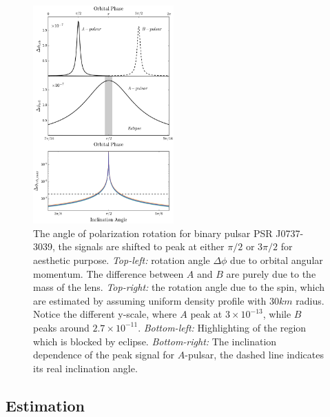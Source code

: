 \documentclass[aps,showpacs,twocolumn,floats,prd,superscriptaddress,nofootinbib]{revtex4}
\begin{document}
\begin{figure}
\includegraphics[width=0.48\textwidth]{rotang.eps}
\caption{\label{fig:rotang}
The angle of polarization rotation for binary pulsar PSR J0737-3039, the signals are shifted to peak at either $\pi/2$ 
or  $3\pi/2$ for aesthetic purpose. {\it Top-left:} rotation angle $\Delta \phi$ due to orbital angular momentum. 
The difference between $A$ and $B$ are purely due to the mass of the lens. {\it Top-right:} the rotation angle due 
to the spin, which are estimated by assuming uniform density profile with $30 km$ radius.  Notice the different 
y-scale, where $A$ peak at $3\times 10^{-13}$, while $B$ peaks around $2.7\times 10^{-11}$. 
{\it Bottom-left:} Highlighting of the region which is blocked by eclipse. 
{\it Bottom-right:}  The inclination dependence of the peak signal for $A$-pulsar, the dashed line indicates its
real inclination angle.
 }
\end{figure}


\subsection{Estimation}
\end{document}
